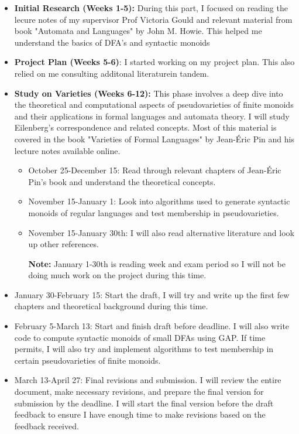 \begin{itemize}
	\item \textbf{Initial Research (Weeks 1-5):}  During this part, I focused on reading the lecure notes of my supervisor Prof Victoria Gould and relevant material from book "Automata and Languages" by John M. Howie. This helped me understand the basics of DFA's and syntactic monoids
	\item \textbf{Project Plan (Weeks 5-6)}: I started working on my project plan. This also relied on me consulting additonal literaturein tandem.
	\item \textbf{Study on Varieties (Weeks 6-12):} This phase involves a deep dive into the theoretical and computational aspects of pseudovarieties of finite monoids and their applications in formal languages and automata theory. I will study Eilenberg's correspondence and related concepts. Most of this material is covered in the book "Varieties of Formal Languages" by Jean-Éric Pin and his lecture notes available online.
	\begin{itemize}
		\item October 25-December 15: Read through relevant chapters of Jean-Éric Pin's book and understand the theoretical concepts.
		\item November 15-January 1: Look into algorithms used to generate syntactic monoids of regular languages and test membership in pseudovarieties.
		\item November 15-January 30th: I will also read alternative literature and look up other references.
		
		\textbf{Note:} January 1-30th is reading week and exam period so I will not be doing much work on the project during this time.
	\end{itemize}
	\item January 30-February 15: Start the draft, I will try and write up the first few chapters and theoretical background during this time.
		\item February 5-March 13: Start and finish draft before deadline. I will also write code to compute syntactic monoids of small DFAs using GAP. If time permits, I will also try and implement algorithms to test membership in certain pseudovarieties of finite monoids.
		\item March 13-April 27: Final revisions and submission. I will review the entire document, make necessary revisions, and prepare the final version for submission by the deadline. I will start the final version before the draft feedback to ensure I have enough time to make revisions based on the feedback received.
\end{itemize}
